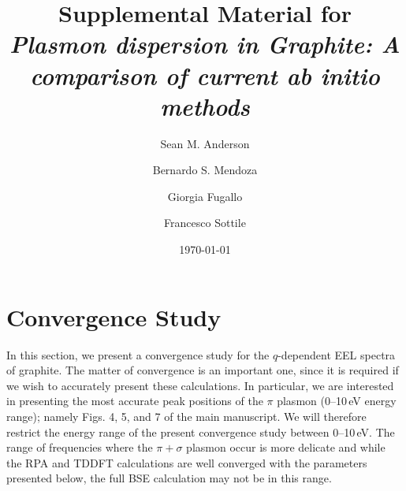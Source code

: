 \documentclass[aps,prb,10pt,superscriptaddress,notitlepage,endfloats]{revtex4-1}
\begin{document}
\title{Supplemental Material for
\emph{Plasmon dispersion in Graphite: A comparison of current \emph{ab initio}
methods}}
\author{Sean M. Anderson}%
\author{Bernardo S. Mendoza}%
\author{Giorgia Fugallo}%
\author{Francesco Sottile}%
\date{\today}

\maketitle


\section{Convergence Study}

In this section, we present a convergence study for the $q$-dependent EEL spectra
of graphite. The matter of convergence is an important one, since it is required
if we wish to accurately present these calculations. In particular, we are
interested in presenting the most accurate peak positions of the $\pi$ plasmon
(0--10\,eV energy range); namely Figs. 4, 5, and 7 of the main manuscript. We
will therefore restrict the energy range of the present convergence study
between 0--10\,eV. The range of frequencies where the $\pi + \sigma$ plasmon
occur is more delicate and while the RPA and TDDFT calculations are well
converged with the parameters presented below, the full BSE calculation may
not be in this range.
\end{document}

